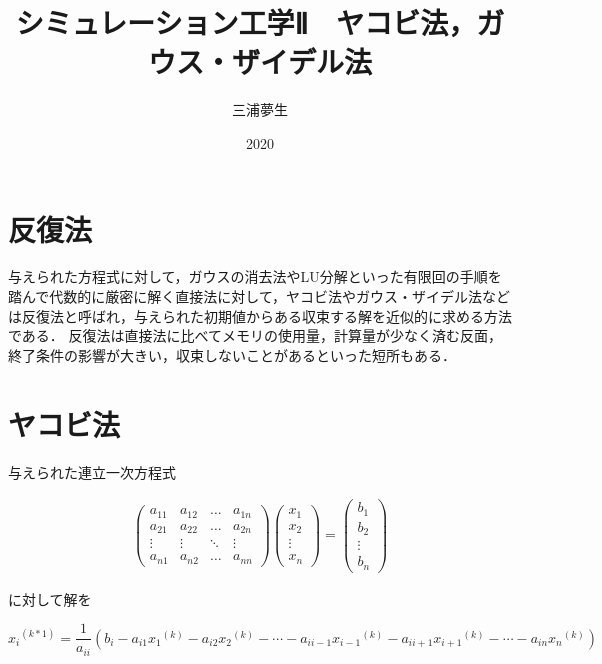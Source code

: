 \documentclass[a4paper, titlepage]{jsarticle}
\title{シミュレーション工学Ⅱ　ヤコビ法，ガウス・ザイデル法}
\author{三浦夢生}
\date{2020}
\begin{document}
	\maketitle

	\section{反復法}
	与えられた方程式に対して，ガウスの消去法やLU分解といった有限回の手順を踏んで代数的に厳密に解く直接法に対して，ヤコビ法やガウス・ザイデル法などは反復法と呼ばれ，与えられた初期値からある収束する解を近似的に求める方法である．
	反復法は直接法に比べてメモリの使用量，計算量が少なく済む反面，終了条件の影響が大きい，収束しないことがあるといった短所もある．

	\section{ヤコビ法}
	与えられた連立一次方程式
	
		\begin{align}
			\left(
				\begin{array}{cccc}
					{a_{11}} & {a_{12}} & {\ldots} & {a_{1n}} \\
					{a_{21}} & {a_{22}} & {\ldots} & {a_{2n}} \\
					{\vdots} & {\vdots} & {\ddots} & {\vdots} \\
					{a_{n1}} & {a_{n2}} & {\ldots} & {a_{nn}}
				\end{array}
			\right)
			\left(
				\begin{array}{cccc}
					{x_{1}} \\
					{x_{2}} \\
					{\vdots} \\
					{x_{n}}
				\end{array}
			\right)
			=
			\left(
				\begin{array}{cccc}
					{b_{1}} \\
					{b_{2}} \\
					{\vdots} \\
					{b_{n}}
				\end{array}
			\right)
		\end{align}

	に対して解を

		\begin{equation}
			{{x_{i}}^{(k*1)}} = {\frac{1}{a_{ii}}}({b_{i}} - {a_{i1}}{{x_{1}}^{(k)}} - {a_{i2}}{{x_{2}}^{(k)}} - {\cdots} - {a_{ii-1}}{{x_{i-1}}^{(k)}} - {a_{ii+1}}{{x_{i+1}}^{(k)}} - {\cdots} - {a_{in}}{{x_{n}}^{(k)}})
		\end{equation}
\end{document}
